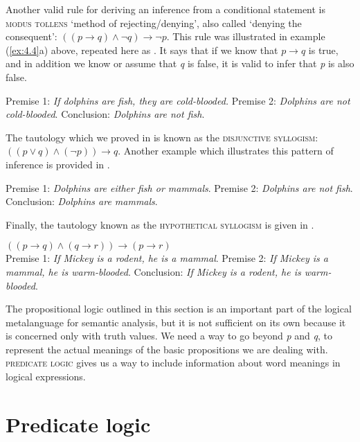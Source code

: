 Another valid rule for deriving an inference from a conditional statement is \textsc{modus tollens} ‘method of rejecting/denying’, also called ‘denying the consequent’: $((p\rightarrow q) \wedge \neg q) \rightarrow \neg p$. This rule was illustrated in example (\ref{ex:4.4}a) above, repeated here as . It says that if we know that $p\rightarrow q$ is true, and in addition we know or assume that \textit{q} is false, it is valid to infer that \textit{p} is also false.

\settowidth{}
\ea \label{ex:4.18}
Premise 1: \textit{If dolphins are fish, they are cold-blooded.} 
Premise 2: \textit{Dolphins are not cold-blooded}.   
\FelixHRule
Conclusion: \textit{Dolphins are not fish}.   
\z


The tautology which we proved in  is known as the \textsc{disjunctive syllogism}: $((p\vee q) \wedge (\neg p)) \rightarrow q$. Another example which illustrates this pattern of inference is provided in .


\ea \label{ex:4.19}
Premise 1: \textit{Dolphins are either fish or mammals}.  
Premise 2: \textit{Dolphins are not fish}.  
\FelixHRule
Conclusion: \textit{Dolphins are mammals}.   
\z


Finally, the tautology known as the \textsc{hypothetical syllogism} is given in .


\ea \label{ex:4.20}
$((p\rightarrow q) \wedge (q\rightarrow r)) \rightarrow (p\rightarrow r)$\\
Premise 1: \textit{If Mickey is a rodent, he is a mammal}.  
Premise 2: \textit{If Mickey is a mammal, he is warm-blooded}.  
\FelixHRule
Conclusion: \textit{If Mickey is a rodent, he is warm-blooded}.  
\z

The propositional logic outlined in this section is an important part of the logical metalanguage for semantic analysis, but it is not sufficient on its own because it is concerned only with truth values. We need a way to go beyond \textit{p} and \textit{q}, to represent the actual meanings of the basic propositions we are dealing with. \textsc{predicate logic} gives us a way to include information about word meanings in logical expressions. 

\section{Predicate logic}\label{sec:4.4}

